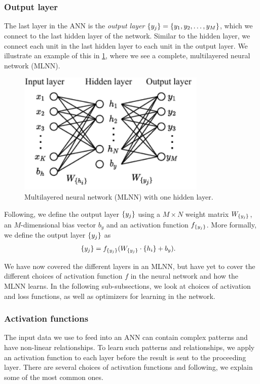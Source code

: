 \subsubsection{Output layer}
\label{sec:ann-output-layer}
The last layer in the ANN is the \textit{output layer} $\left\{ {y}_{j} \right\} = \left\{ y_1, y_2, \ldots, y_M \right\}$, which we connect to the last hidden layer of the network. Similar to the hidden layer, we connect each unit in the last hidden layer to each unit in the output layer. We illustrate an example of this in \cref{fig:mlnn-one-hidden}, where we see a complete, multilayered neural network (MLNN).
\begin{figure}[H]
    \centering
    \includegraphics[width=9cm]{thesis/figures/artificial-neural-network_cropped.pdf}
    \caption{Multilayered neural network (MLNN) with one hidden layer.}
    \label{fig:mlnn-one-hidden}
\end{figure}

Following, we define the output layer $\left\{ {y}_{j} \right\}$ using a $M \times N$ weight matrix $W_{\left\{ {y}_{j} \right\}}$, an $M$-dimensional bias vector $b_y$ and an activation function $f_{\left\{ {y}_{j} \right\}}$. More formally, we define the output layer $\left\{ {y}_{j} \right\}$ as
\begin{align}
    \label{eqn:output-layer-ann}
    \left\{ {y}_{j} \right\} &= f_{\left\{ {y}_{j} \right\}}(W_{\left\{ {y}_{j} \right\}} \cdot \left\{ {h}_{i} \right\} + b_y).
\end{align}

We have now covered the different layers in an MLNN, but have yet to cover the different choices of activation function $f$ in the neural network and how the MLNN learns. In the following sub-subsections, we look at choices of activation and loss functions, as well as optimizers for learning in the network.

\subsubsection{Activation functions}
\label{sec:ann-activation-functions}
The input data we use to feed into an ANN can contain complex patterns and have non-linear relationships. To learn such patterns and relationships, we apply an activation function to each layer before the result is sent to the proceeding layer. There are several choices of activation functions and following, we explain some of the most common ones.

